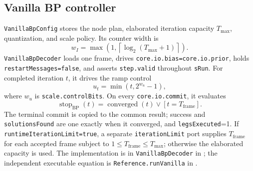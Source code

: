 \documentclass[10pt,conference]{IEEEtran}
\begin{document}
\subsection{Vanilla BP controller}
\texttt{VanillaBpConfig} stores the node plan, elaborated iteration capacity
$T_{\max}$, quantization, and scale policy.  Its counter width is
\begin{equation}
 w_I=\max\!\left(1,\left\lceil\log_2(T_{\max}+1)\right\rceil\right).
 \label{eq:vanilla-counter-width}
\end{equation}
\texttt{VanillaBpDecoder} loads one frame, drives
\texttt{core.io.bias=core.io.prior}, holds
\texttt{restartMessages=false}, and asserts \texttt{step.valid} throughout
\texttt{sRun}.  For completed iteration $t$, it drives the ramp control
\begin{equation}
 u_t=\min(t,2^{w_u}-1),
 \label{eq:scale-control}
\end{equation}
where $w_u$ is \texttt{scale.controlBits}.  On every \texttt{core.io.commit},
it evaluates
\begin{equation}
 \operatorname{stop}_{\mathrm{BP}}(t)=
 \operatorname{converged}(t)\lor[t=T_{\mathrm{frame}}].
 \label{eq:vanilla-stop}
\end{equation}
The terminal commit is copied to the common result; success and
\texttt{solutionsFound} are one exactly when it converged, and
\texttt{legsExecuted}=1.  If \texttt{runtimeIterationLimit=true}, a separate
\texttt{iterationLimit} port supplies $T_{\mathrm{frame}}$ for each accepted
frame subject to $1\leq T_{\mathrm{frame}}\leq T_{\max}$; otherwise the
elaborated capacity is used.  The implementation is in
\texttt{VanillaBpDecoder} in ; the independent executable
equation is \texttt{Reference.runVanilla} in .
\end{document}
